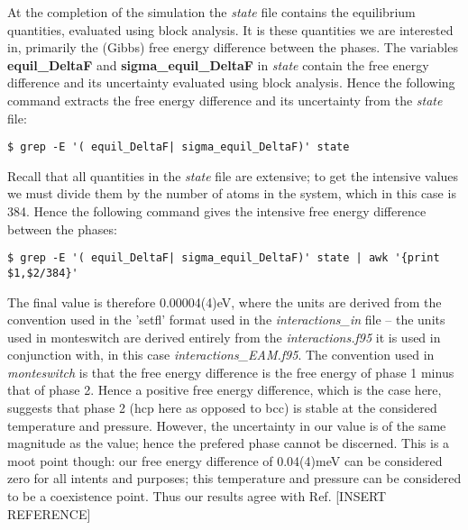 \documentclass{report}
\begin{document}
At the completion of the simulation the \emph{state} file contains the equilibrium quantities, evaluated using block analysis. It is these quantities we
are interested in, primarily the (Gibbs) free energy difference between the phases. The variables \textbf{equil\_DeltaF} and \textbf{sigma\_equil\_DeltaF}
in \emph{state} contain
the free energy difference and its uncertainty evaluated using block analysis. Hence the following command extracts the free energy difference and its
uncertainty from the \emph{state} file:
\begin{verbatim}
$ grep -E '( equil_DeltaF| sigma_equil_DeltaF)' state
\end{verbatim}
Recall that all quantities in the \emph{state} file are extensive; to get the intensive values we must divide them by the number of atoms in the system, which
in this case is 384. Hence the following command gives the intensive free energy difference between the phases:
\begin{verbatim}
$ grep -E '( equil_DeltaF| sigma_equil_DeltaF)' state | awk '{print $1,$2/384}'
\end{verbatim}
The final value is therefore 0.00004(4)eV, where the units are derived from the convention used in the 'setfl' format used in the \emph{interactions\_in}
file -- the units used in monteswitch are derived entirely from the \emph{interactions.f95} it is used in conjunction with, in this case 
\emph{interactions\_EAM.f95}.
The convention used in \emph{monteswitch} is that the free energy difference is the free energy of phase 1 minus that of phase 2. Hence a positive free energy
difference, which is the case here, suggests that phase 2 (hcp here as opposed to bcc) is stable at the considered temperature and pressure. 
However, the uncertainty in our value is of the same magnitude as the value; hence the prefered phase cannot be discerned. This is a moot point though:
our free energy difference of 0.04(4)meV can be considered zero for all intents and purposes; this temperature and pressure can be considered to be
a coexistence point. Thus our results agree with Ref. [INSERT REFERENCE]
\end{document}
